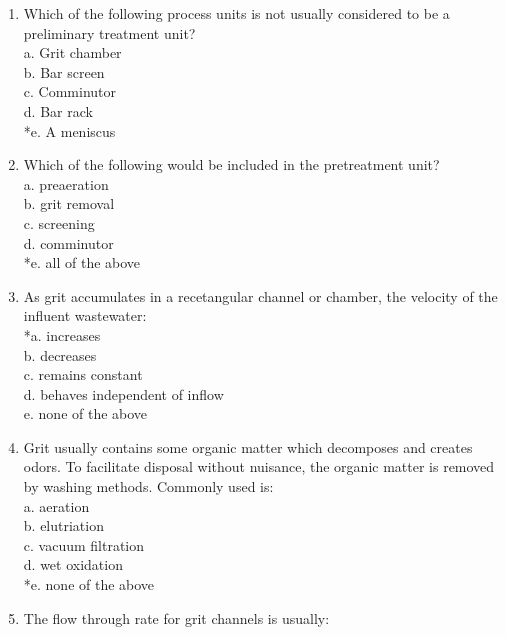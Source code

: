\begin{enumerate}
\vspace{0.4cm}
\item Which of the following process units is not usually considered to be a preliminary treatment unit? \\

a. Grit chamber \\
b. Bar screen \\
c. Comminutor \\
d. Bar rack \\
*e. A meniscus 

\vspace{0.4cm}
\item  Which of the following would be included in the pretreatment unit? \\

a. preaeration \\
b. grit removal \\
c. screening \\
d. comminutor \\
*e. all of the above 

\vspace{0.4cm}
\item  As grit accumulates in a recetangular channel or chamber, the velocity of the influent wastewater: \\

*a. increases \\
b. decreases \\
c. remains constant \\
d. behaves independent of inflow \\
e. none of the above 

\vspace{0.4cm}
\item  Grit usually contains some organic matter which decomposes and creates odors. To facilitate disposal without nuisance, the organic matter is removed by washing methods. Commonly used is: \\

a. aeration \\
b. elutriation \\
c. vacuum filtration \\
d. wet oxidation \\
*e. none of the above 

\vspace{0.4cm}
\item  The flow through rate for grit channels is usually: \\


\end{enumerate}
